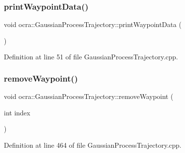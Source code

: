 \hypertarget{classocra_1_1GaussianProcessTrajectory_a9bc3e80de07b90f2fc13bd8442fb7d02}{}\label{classocra_1_1GaussianProcessTrajectory_a9bc3e80de07b90f2fc13bd8442fb7d02} 
\subsubsection{\texorpdfstring{print\+Waypoint\+Data()}{printWaypointData()}}
{\footnotesize\ttfamily void ocra\+::\+Gaussian\+Process\+Trajectory\+::print\+Waypoint\+Data (\begin{DoxyParamCaption}{ }\end{DoxyParamCaption})}



Definition at line 51 of file Gaussian\+Process\+Trajectory.\+cpp.

\hypertarget{classocra_1_1GaussianProcessTrajectory_a56de119b85b7646942cb85f434be7e43}{}\label{classocra_1_1GaussianProcessTrajectory_a56de119b85b7646942cb85f434be7e43} 
\subsubsection{\texorpdfstring{remove\+Waypoint()}{removeWaypoint()}}
{\footnotesize\ttfamily void ocra\+::\+Gaussian\+Process\+Trajectory\+::remove\+Waypoint (\begin{DoxyParamCaption}\item[{int}]{index }\end{DoxyParamCaption})}



Definition at line 464 of file Gaussian\+Process\+Trajectory.\+cpp.

\hypertarget{classocra_1_1GaussianProcessTrajectory_ad7fc4b5e2163353090d6d34bd5040961}{}\label{classocra_1_1GaussianProcessTrajectory_ad7fc4b5e2163353090d6d34bd5040961} 

